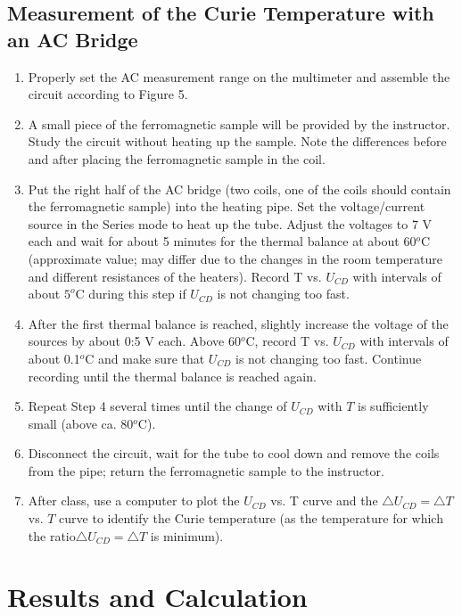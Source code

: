 \documentclass[12pt]{article}
\begin{document}
\subsection{Measurement of the Curie Temperature with an AC Bridge}
\begin{enumerate}
\item Properly set the AC measurement range on the multimeter and assemble the circuit
according to Figure 5.
\item A small piece of the ferromagnetic sample will be provided by the instructor. Study the circuit without heating up the sample. Note the differences before and after
placing the ferromagnetic sample in the coil.
\item Put the right half of the AC bridge (two coils, one of the coils should contain the
ferromagnetic sample) into the heating pipe. Set the voltage/current source in the
Series mode to heat up the tube. Adjust the voltages to 7 V each and wait for
about 5 minutes for the thermal balance at about 60$^o$C (approximate value; may
differ due to the changes in the room temperature and different resistances of the
heaters). Record T vs. $U_{CD}$ with intervals of about $5^o$C during this step if $U_{CD}$ is not changing too fast.
\item After the first thermal balance is reached, slightly increase the voltage of the sources
by about 0:5 V each. Above 60$^o$C, record T vs. $U_{CD}$ with intervals of about 0.1$^o$C
and make sure that $U_{CD}$ is not changing too fast. Continue recording until the
thermal balance is reached again.
\item Repeat Step 4 several times until the change of $U_{CD}$ with $T$ is sufficiently small
(above ca. 80$^o$C).
\item Disconnect the circuit, wait for the tube to cool down and remove the coils from
the pipe; return the ferromagnetic sample to the instructor.
\item After class, use a computer to plot the $U_{CD}$ vs. T curve and the $\bigtriangleup U_{CD}=\bigtriangleup T$ vs. $T$ curve to identify the Curie temperature (as the temperature for which the ratio$\bigtriangleup U_{CD}=\bigtriangleup T$ is minimum).
\end{enumerate}
\section{Results and Calculation}
\end{document}
